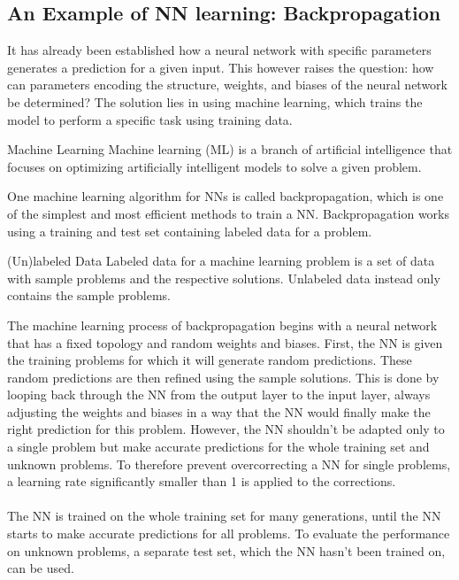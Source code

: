 \subsection{An Example of NN learning: Backpropagation}\label{subsec:an-example-of-nn-learning:-backpropagation}
It has already been established how a neural network with specific parameters generates a prediction for a given input.
This however raises the question: how can parameters encoding the structure, weights, and biases of the neural network be determined?
The solution lies in using machine learning, which trains the model to perform a specific task using training data.
\begin{mydef}{Machine Learning}
    Machine learning (ML) is a branch of artificial intelligence that focuses on optimizing artificially intelligent models to solve a given problem.\cite{IBM_Machine_Learning}
\end{mydef}
One machine learning algorithm for NNs is called backpropagation, which is one of the simplest and most efficient methods to train a NN.\cite{Al-Masri2024}
Backpropagation works using a training and test set containing labeled data for a problem.
\begin{mydef}{(Un)labeled Data}
    Labeled data for a machine learning problem is a set of data with sample problems and the respective solutions.
    Unlabeled data instead only contains the sample problems.\cite{IBM_Data_Labeling}
\end{mydef}
The machine learning process of backpropagation begins with a neural network that has a fixed topology and random weights and biases.
First, the NN is given the training problems for which it will generate random predictions.
These random predictions are then refined using the sample solutions.
This is done by looping back through the NN from the output layer to the input layer, always adjusting the weights and biases in a way that the NN would finally make the right prediction for this problem.
However, the NN shouldn't be adapted only to a single problem but make accurate predictions for the whole training set and unknown problems.
To therefore prevent overcorrecting a NN for single problems, a learning rate significantly smaller than 1 is applied to the corrections.
\\ \\
The NN is trained on the whole training set for many generations, until the NN starts to make accurate predictions for all problems.
To evaluate the performance on unknown problems, a separate test set, which the NN hasn't been trained on, can be used.


